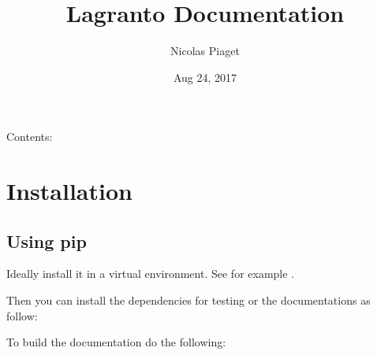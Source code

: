 \documentclass[a4paper,10pt,english]{sphinxmanual}
\title{Lagranto Documentation}
\date{Aug 24, 2017}
\author{Nicolas Piaget}
\begin{document}
\maketitle
\sphinxtableofcontents
{}\label{\detokenize{index::doc}}


Contents:


\chapter{Installation}
\label{\detokenize{install:installation}}\label{\detokenize{install:contents}}\label{\detokenize{install::doc}}\label{\detokenize{install:welcome-to-lagranto-s-documentation}}

\section{Using pip}
\label{\detokenize{install:using-pip}}
Ideally install it in a virtual environment. See for example .

\begin{sphinxVerbatim}[commandchars=\\\{\}]
   
\end{sphinxVerbatim}

Then you can install the dependencies for testing or the documentations as follow:

\begin{sphinxVerbatim}[commandchars=\\\{\}]
  \PYG{p}{[}\PYG{p}{]}
  \PYG{p}{[}\PYG{p}{]}
\end{sphinxVerbatim}

To build the documentation do the following:

\begin{sphinxVerbatim}[commandchars=\\\{\}]
 
 
 
\end{sphinxVerbatim}
\end{document}
